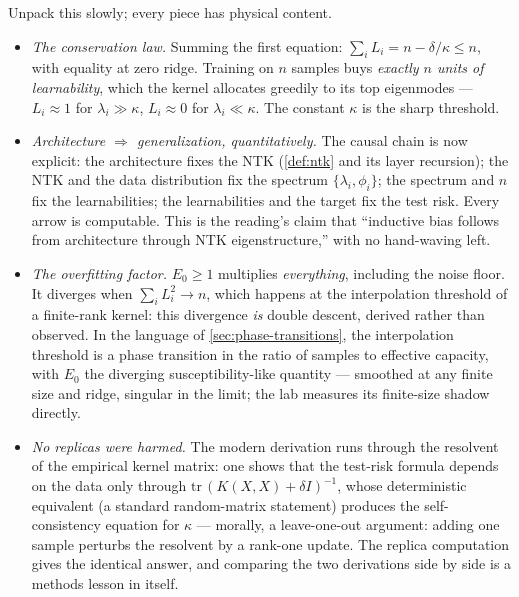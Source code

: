 \documentclass[11pt]{article}
\begin{document}
Unpack this slowly; every piece has physical content.
\begin{itemize}
  \item \emph{The conservation law.} Summing the first equation:
  $\sum_i L_i = n - \delta/\kappa \le n$, with equality at zero ridge.
  Training on $n$ samples buys \emph{exactly $n$ units of learnability},
  which the kernel allocates greedily to its top eigenmodes --- $L_i
  \approx 1$ for $\lambda_i \gg \kappa$, $L_i \approx 0$ for
  $\lambda_i \ll \kappa$. The constant $\kappa$ is the sharp threshold.
  \item \emph{Architecture $\Rightarrow$ generalization, quantitatively.}
  The causal chain is now explicit: the architecture fixes the NTK
  (\cref{def:ntk} and its layer recursion); the NTK and the data
  distribution fix the spectrum $\{\lambda_i, \phi_i\}$; the spectrum and
  $n$ fix the learnabilities; the learnabilities and the target fix the
  test risk. Every arrow is computable. This is the reading's claim that
  ``inductive bias follows from architecture through NTK eigenstructure,''
  with no hand-waving left.
  \item \emph{The overfitting factor.} $E_0 \geq 1$ multiplies
  \emph{everything}, including the noise floor. It diverges when
  $\sum_i L_i^2 \to n$, which happens at the interpolation threshold of a
  finite-rank kernel: this divergence \emph{is} double descent, derived
  rather than observed. In the language of \cref{sec:phase-transitions},
  the interpolation threshold is a phase transition in the ratio of
  samples to effective capacity, with $E_0$ the diverging
  susceptibility-like quantity --- smoothed at any finite size and ridge,
  singular in the limit; the lab measures its finite-size shadow directly.
  \item \emph{No replicas were harmed.} The modern derivation runs through
  the resolvent of the empirical kernel matrix: one shows that the
  test-risk formula depends on the data only through
  $\mathrm{tr}\,(K(X,X) + \delta I)^{-1}$, whose deterministic equivalent
  (a standard random-matrix statement) produces the self-consistency
  equation for $\kappa$ --- morally, a leave-one-out argument: adding one
  sample perturbs the resolvent by a rank-one update. The replica
  computation \cite{canatar2021spectral} gives the identical answer, and
  comparing the two derivations side by side is a methods lesson in
  itself.
\end{itemize}
\end{document}
